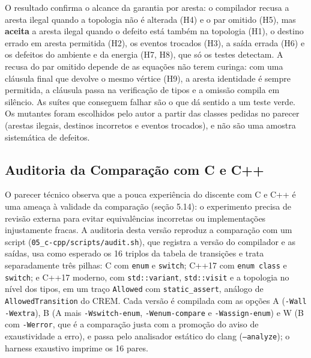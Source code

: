 \documentclass[12pt,a4paper]{article}
\begin{document}
O resultado confirma o alcance da garantia por aresta: o compilador recusa a aresta ilegal quando a topologia não é alterada (H4) e o par omitido (H5), mas \textbf{aceita} a aresta ilegal quando o defeito está também na topologia (H1), o destino errado em aresta permitida (H2), os eventos trocados (H3), a saída errada (H6) e os defeitos do ambiente e da energia (H7, H8), que só os testes detectam. A recusa do par omitido depende de as equações não terem curinga: com uma cláusula final que devolve o mesmo vértice (H9), a aresta identidade é sempre permitida, a cláusula passa na verificação de tipos e a omissão compila em silêncio. As suítes que conseguem falhar são o que dá sentido a um teste verde. Os mutantes foram escolhidos pelo autor a partir das classes pedidas no parecer (arestas ilegais, destinos incorretos e eventos trocados), e não são uma amostra sistemática de defeitos.


\subsection{Auditoria da Comparação com C e C++}

O parecer técnico observa que a pouca experiência do discente com C e C++ é uma ameaça à validade da comparação (seção 5.14): o experimento precisa de revisão externa para evitar equivalências incorretas ou implementações injustamente fracas. A auditoria desta versão reproduz a comparação com um script (\texttt{05\_c-cpp/scripts/audit.sh}), que registra a versão do compilador e as saídas, usa como esperado os 16 triplos da tabela de transições e trata separadamente três pilhas: C com \texttt{enum} e \texttt{switch}; C++17 com \texttt{enum class} e \texttt{switch}; e C++17 moderno, com \texttt{std::variant}, \texttt{std::visit} e a topologia no nível dos tipos, em um traço \texttt{Allowed} com \texttt{static\_assert}, análogo de \texttt{AllowedTransition} do CREM. Cada versão é compilada com as opções A (\texttt{-Wall -Wextra}), B (A mais \texttt{-Wswitch-enum}, \texttt{-Wenum-compare} e \texttt{-Wassign-enum}) e W (B com \texttt{-Werror}, que é a comparação justa com a promoção do aviso de exaustividade a erro), e passa pelo analisador estático do clang (\texttt{--analyze}); o harness exaustivo imprime os 16 pares.
\end{document}
